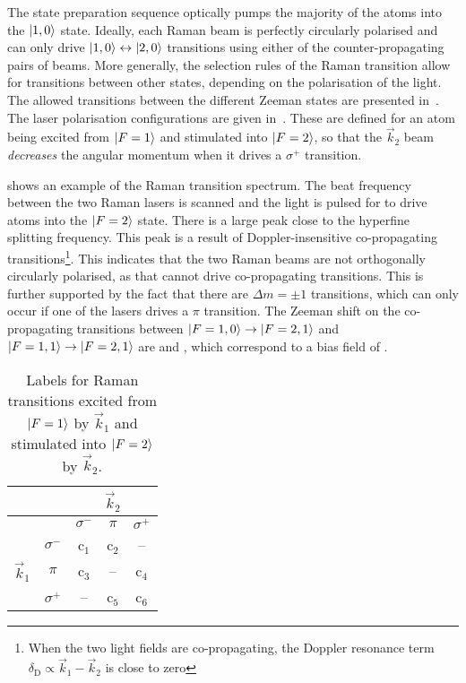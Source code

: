 The state preparation sequence optically pumps the majority of the atoms 
into the \(\ket{1,0}\) state. Ideally, each
Raman beam is perfectly circularly polarised and can only drive
\(\ket{1,0}\leftrightarrow\ket{2,0}\) transitions using either of the
counter-propagating pairs of beams. More generally, the selection
rules of the Raman transition allow for transitions between other
states, depending on the polarisation of the light. The allowed
transitions between the different Zeeman states are presented
in~. The laser polarisation
configurations are given in~. These
are defined for an atom being excited from \(\ket{F=1}\) and
stimulated into \(\ket{F=2}\), so that the \(\vec{k}_2\) beam
\textit{decreases} the angular momentum when it drives a \(\sigma^+\)
transition. \nocite{Gauguet2008} 
\par\noindent
{} shows an example of the Raman
transition spectrum. The beat frequency
between the two Raman lasers is scanned and the light is pulsed for
 to drive atoms into the \(\ket{F=2}\)
state. There is a large peak close to the hyperfine splitting
frequency. This peak is a result of Doppler-insensitive co-propagating
transitions\footnote{When the two light fields are co-propagating, the
  Doppler resonance term \(\delta_\text{D} \propto \vec{k}_1 -
\vec{k}_2\) is close to zero}. This indicates that the two Raman beams
are not orthogonally circularly polarised, as that cannot drive co-propagating
transitions. This is further supported by the fact
that there are \(\Delta m = \pm 1\) transitions, which can only occur
if one of the lasers drives a \(\pi\) transition. The Zeeman shift on
the co-propagating transitions between \(\ket{F=1,0}
\rightarrow \ket{F=2,1}\) and \(\ket{F=1,1}\rightarrow \ket{F=2,1}\)
are  and , which
correspond to a bias field of .
\begin{table}
  \centering
  \begin{tabular}{ccccc}
    \toprule
    & & \multicolumn{3}{c}{\(\vec{k}_2\)} \\
     \midrule
     & & \(\sigma^-\) & \(\pi\) & \(\sigma^+\)\\
     \multirow{3}{*}{\(\vec{k}_1\)} & \(\sigma^-\) &  c\(_1\) &
     c\(_2\)&
     --  \\
     & \(\pi\) &c\(_3\) & -- & c\(_4\) \\
     & \(\sigma^+\) & --& c\(_5\)& c\(_6\)\\
    \bottomrule
  \end{tabular}
  \caption[Raman transition polarisation configurations]{Labels for Raman transitions excited
    from \(\ket{F=1}\) by \(\vec{k}_1\) and stimulated into
  \(\ket{F=2}\) by \(\vec{k}_2\).}
  \label{tab:raman_pol_config}
\end{table}
